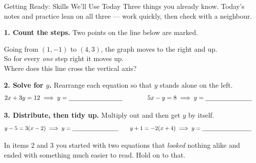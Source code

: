 \documentclass[12pt]{article}
\newcommand{\lgrid}[4]{%
  \draw[step=1, linegray!40, very thin] (#1,#3) grid (#2,#4);
  \draw[->, semithick, charcoal] (#1,0)--(#2,0) node[below right, font=\scriptsize]{$x$};
  \draw[->, semithick, charcoal] (0,#3)--(0,#4) node[left, font=\scriptsize]{$y$};}
\begin{document}

\vspace{0.10in}

\begin{notesbox}{Getting Ready: Skills We'll Use Today}
Three things you already know. Today's notes and practice lean on all three --- work quickly, then
check with a neighbour.

\vspace{10pt}
\textbf{1. Count the steps.} Two points on the line below are marked.
\begin{center}
\begin{minipage}{0.40\linewidth}\centering
{}
\end{minipage}%
\begin{minipage}{0.56\linewidth}\raggedright
  Going from $(1,-1)$ to $(4,3)$, the graph moves \blank{1.4cm} to the right
  and \blank{1.4cm} up. \\[6pt]
  So for every \emph{one} step right it moves \blank{1.6cm} up. \\[6pt]
  Where does this line cross the vertical axis? \blank{1.8cm}
\end{minipage}
\end{center}

\vspace{12pt}
\textbf{2. Solve for $y$.} Rearrange each equation so that $y$ stands alone on the left.
\[
  2x + 3y = 12 \;\Longrightarrow\; y = \blank{3.0cm}
  \qquad\qquad
  5x - y = 8 \;\Longrightarrow\; y = \blank{2.6cm}
\]

\vspace{12pt}
\textbf{3. Distribute, then tidy up.} Multiply out and then get $y$ by itself.
\[
  y - 5 = 3(x - 2) \;\Longrightarrow\; y = \blank{2.8cm}
  \qquad
  y + 1 = -2(x + 4) \;\Longrightarrow\; y = \blank{3.0cm}
\]

\vspace{12pt}
{In items 2 and 3 you started with two equations that \emph{looked} nothing alike and ended
with something much easier to read. Hold on to that.}
\end{notesbox}
\end{document}
